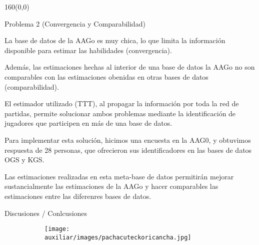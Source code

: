\documentclass[shownotes,aspectratio=169]{beamer}
\begin{document}
\begin{frame}[plain]
\begin{textblock}{160}(0,0)
\begin{center}
 \Large Problema 2 (Convergencia y Comparabilidad)
\end{center}
\end{textblock}
 \vspace{0.75cm} \pause
 
  La base de datos de la AAGo es muy chica, lo que limita la información disponible para estimar las habilidades (convergencia).
  
 \vspace{0.3cm} \pause
 
 Además, las estimaciones hechas al interior de una base de datos la AAGo no son comparables con las estimaciones obenidas en otras bases de datos (comparabilidad).
 
 \vspace{0.3cm} \pause
 
 El estimador utilizado (TTT), al propagar la información por toda la red de partidas, permite solucionar ambos problemas mediante la identificación de jugadores que participen en más de una base de datos.
 
 \vspace{0.3cm} \pause
 
 Para implementar esta solución, hicimos una encuesta en la AAG0, y obtuvimos respuesta de 28 personas, que ofrecieron sus identificadores en las bases de datos OGS y KGS.
 
 \vspace{0.3cm} \pause
 
 Las estimaciones realizadas en esta meta-base de datos permitirán mejorar sustancialmente las estimaciones de la AAGo y hacer comparables las estimaciones entre las diferenres bases de datos.
 
\end{frame}



\begin{frame}[plain]
 \centering
 \LARGE Discusiones / Conlcusiones
 
\end{frame}


\begin{frame}[plain]
 
 \begin{figure}[H]     
     \centering
     \begin{subfigure}[b]{0.33\textwidth}
       \texttt{[image: auxiliar/images/pachacuteckoricancha.jpg]} 
     \end{subfigure}
   \end{figure} 
  
\end{frame}
\end{document}
